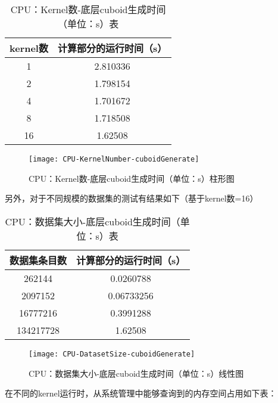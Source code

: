 \begin{table}[!htbp]
\centering
\caption{CPU：Kernel数-底层cuboid生成时间（单位：s）表} 
\label{tab:table4}
\begin{tabular}{|c|c|}
    \hline
    kernel数 & 计算部分的运行时间（s）\\
    \hline
    1 & 2.810336\\
    \hline
    2 & 1.798154\\
    \hline
    4 & 1.701672\\
    \hline
    8 & 1.718508\\
    \hline
    16 & 1.62508\\
    \hline
\end{tabular}
\end{table}

\begin{figure}[ht]
\centering
\texttt{[image: CPU-KernelNumber-cuboidGenerate]}
\caption{CPU：Kernel数-底层cuboid生成时间（单位：s）柱形图} 
\label{fig:figure1}
\end{figure}

另外，对于不同规模的数据集的测试有结果如下（基于kernel数=16）

\begin{table}[!htbp]
\centering
\caption{CPU：数据集大小-底层cuboid生成时间（单位：s）表} 
\label{tab:table5}
\begin{tabular}{|c|c|}
    \hline
    数据集条目数 & 计算部分的运行时间（s）\\
    \hline
    262144 & 0.0260788\\
    \hline
    2097152 & 0.06733256\\
    \hline
    16777216 & 0.3991288\\
    \hline
    134217728 & 1.62508\\
    \hline
\end{tabular}
\end{table}

\begin{figure}[ht]
\centering
\texttt{[image: CPU-DatasetSize-cuboidGenerate]}
\caption{CPU：数据集大小-底层cuboid生成时间（单位：s）线性图} 
\label{fig:figure2}
\end{figure}

在不同的kernel运行时，从系统管理中能够查询到的内存空间占用如下表：

